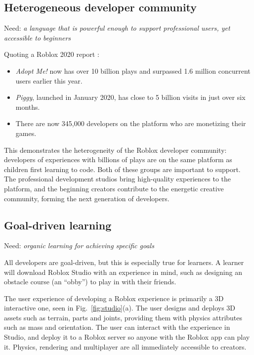 \documentclass[acmsmall]{acmart}
\begin{document}
\subsection{Heterogeneous developer community}

Need: \emph{a language that is powerful enough to support professional users, yet accessible to beginners}

Quoting a Roblox 2020 report \cite{RobloxDevelopers}:
\begin{itemize}
\item \emph{Adopt Me!} now has over 10 billion plays and surpassed 1.6 million concurrent users earlier this year.
\item \emph{Piggy}, launched in January 2020, has close to 5 billion visits in just over six months.
\item There are now 345,000 developers on the platform who are monetizing their games.
\end{itemize}
This demonstrates the heterogeneity of the Roblox developer community:
developers of experiences with billions of plays are on the same
platform as children first learning to code. Both of these groups are important to
support. The professional development studios bring high-quality experiences to the
platform, and the beginning creators contribute to the energetic creative community,
forming the next generation of developers.

\subsection{Goal-driven learning}

Need: \emph{organic learning for achieving specific goals}

All developers are goal-driven, but this is especially true for
learners. A learner will download Roblox Studio with an
experience in mind, such as designing an obstacle course (an ``obby'')
to play in with their friends.

The user experience of developing a Roblox experience is primarily a
3D interactive one, seen in Fig.~\ref{fig:studio}(a). The user designs
and deploys 3D assets such as terrain, parts and joints, providing
them with physics attributes such as mass and orientation. The user
can interact with the experience in Studio, and deploy it to a Roblox
server so anyone with the Roblox app can play it. Physics, rendering
and multiplayer are all immediately accessible to creators.
\end{document}

